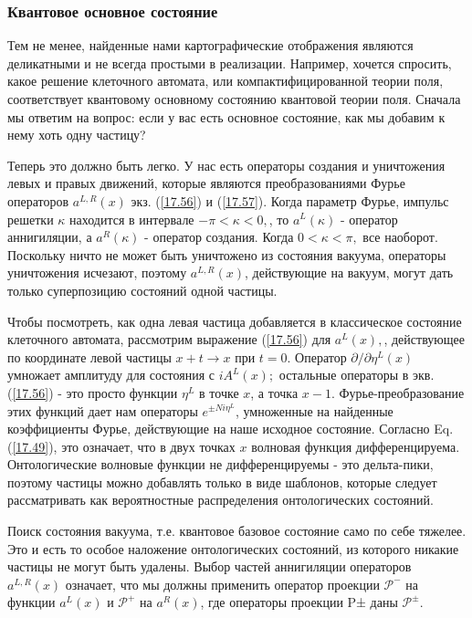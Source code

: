 \documentclass[main.tex]{subfiles}
\begin{document}
\subsubsection{Квантовое основное состояние}\label{ch17.1.5}

Тем не менее, найденные нами картографические отображения являются деликатными и не всегда простыми в реализации. Например, хочется спросить, какое решение клеточного автомата, или компактифицированной теории поля, соответствует квантовому основному состоянию квантовой теории поля. Сначала мы ответим на вопрос: если у вас есть основное состояние, как мы добавим к нему хоть одну частицу?

Теперь это должно быть легко. У нас есть операторы создания и уничтожения левых и правых движений, которые являются преобразованиями Фурье операторов $a^{L, R}(x)$ экз. (\ref{17.56}) и (\ref{17.57}). Когда параметр Фурье, импульс решетки $\kappa$ находится в интервале $-\pi<\kappa<0,$, то $a^{L}(\kappa)$ - оператор аннигиляции, а $a^{R}(\kappa)$ - оператор создания. Когда $0<\kappa<\pi,$ все наоборот. Поскольку ничто не может быть уничтожено из состояния вакуума, операторы уничтожения исчезают, поэтому $a^{L, R}(x)$, действующие на вакуум, могут дать только суперпозицию состояний одной частицы.

Чтобы посмотреть, как одна левая частица добавляется в классическое состояние клеточного автомата, рассмотрим выражение (\ref{17.56}) для $a^{L}(x),$, действующее по координате левой частицы $x+t \rightarrow x$ при $t=0 .$ Оператор $\partial / \partial \eta^{L}(x)$ умножает амплитуду для состояния с $i A^{L}(x) ;$ остальные операторы в экв. (\ref{17.56}) - это просто функции $\eta^{L}$ в точке $x$, а точка $x-1 .$ Фурье-преобразование этих функций дает нам операторы $e^{\pm N i \eta^{L}}$, умноженные на найденные коэффициенты Фурье, действующие на наше исходное состояние. Согласно Eq.(\ref{17.49}), это означает, что в двух точках $x$ волновая функция дифференцируема. Онтологические волновые функции не дифференцируемы - это дельта-пики, поэтому частицы можно добавлять только в виде шаблонов, которые следует рассматривать как вероятностные распределения онтологических состояний.

Поиск состояния вакуума, т.е. квантовое базовое состояние само по себе тяжелее. Это и есть то особое наложение онтологических состояний, из которого никакие частицы не могут быть удалены. Выбор частей аннигиляции операторов $a^{L, R}(x)$ означает, что мы должны применить оператор проекции $\mathcal{P}^-$ на функции $a^{L}(x)$ и $\mathcal{P}^{+}$ на $a^R(x)$, где операторы проекции P± даны $\mathcal{P}^{\pm}$.
\end{document}
